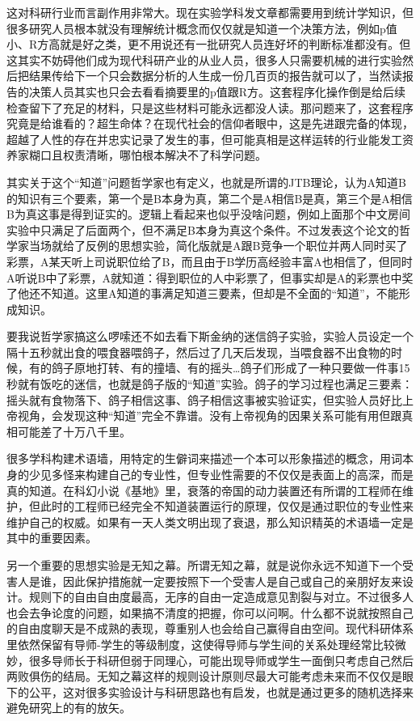 \documentclass[]{tufte-book}
\begin{document}
这对科研行业而言副作用非常大。现在实验学科发文章都需要用到统计学知识，但很多研究人员根本就没有理解统计概念而仅仅就是知道一个决策方法，例如p值小、R方高就是好之类，更不用说还有一批研究人员连好坏的判断标准都没有。但这其实不妨碍他们成为现代科研产业的从业人员，很多人只需要机械的进行实验然后把结果传给下一个只会数据分析的人生成一份几百页的报告就可以了，当然读报告的决策人员其实也只会去看看摘要里的p值跟R方。这套程序化操作倒是给后续检查留下了充足的材料，只是这些材料可能永远都没人读。那问题来了，这套程序究竟是给谁看的？超生命体？在现代社会的信仰者眼中，这是先进跟完备的体现，超越了人性的存在并忠实记录了发生的事，但可能真相是这样运转的行业能发工资养家糊口且权责清晰，哪怕根本解决不了科学问题。

其实关于这个``知道''问题哲学家也有定义，也就是所谓的JTB理论，认为A知道B的知识有三个要素，第一个是B本身为真，第二个是A相信B是真，第三个是A相信B为真这事是得到证实的。逻辑上看起来也似乎没啥问题，例如上面那个中文房间实验中只满足了后面两个，但不满足B本身为真这个条件。不过发表这个论文的哲学家当场就给了反例的思想实验，简化版就是A跟B竞争一个职位并两人同时买了彩票，A某天听上司说职位给了B，而且由于B学历高经验丰富A也相信了，但同时A听说B中了彩票，A就知道：得到职位的人中彩票了，但事实却是A的彩票也中奖了他还不知道。这里A知道的事满足知道三要素，但却是不全面的``知道''，不能形成知识。

要我说哲学家搞这么啰嗦还不如去看下斯金纳的迷信鸽子实验，实验人员设定一个隔十五秒就出食的喂食器喂鸽子，然后过了几天后发现，当喂食器不出食物的时候，有的鸽子原地打转、有的撞墙、有的摇头\ldots 鸽子们形成了一种只要做一件事15秒就有饭吃的迷信，也就是鸽子版的``知道''实验。鸽子的学习过程也满足三要素：摇头就有食物落下、鸽子相信这事、鸽子相信这事被实验证实，但实验人员好比上帝视角，会发现这种``知道''完全不靠谱。没有上帝视角的因果关系可能有用但跟真相可能差了十万八千里。

很多学科构建术语墙，用特定的生僻词来描述一个本可以形象描述的概念，用词本身的少见多怪来构建自己的专业性，但专业性需要的不仅仅是表面上的高深，而是真的知道。在科幻小说《基地》里，衰落的帝国的动力装置还有所谓的工程师在维护，但此时的工程师已经完全不知道装置运行的原理，仅仅是通过职位的专业性来维护自己的权威。如果有一天人类文明出现了衰退，那么知识精英的术语墙一定是其中的重要因素。

另一个重要的思想实验是无知之幕。所谓无知之幕，就是说你永远不知道下一个受害人是谁，因此保护措施就一定要按照下一个受害人是自己或自己的亲朋好友来设计。规则下的自由自由度最高，无序的自由一定造成意见割裂与对立。不过很多人也会去争论度的问题，如果搞不清度的把握，你可以问啊。什么都不说就按照自己的自由度聊天是不成熟的表现，尊重别人也会给自己赢得自由空间。现代科研体系里依然保留有导师-学生的等级制度，这使得导师与学生间的关系处理经常比较微妙，很多导师长于科研但弱于同理心，可能出现导师或学生一面倒只考虑自己然后两败俱伤的结局。无知之幕这样的规则设计原则尽最大可能考虑未来而不仅仅是眼下的公平，这对很多实验设计与科研思路也有启发，也就是通过更多的随机选择来避免研究上的有的放矢。
\end{document}
